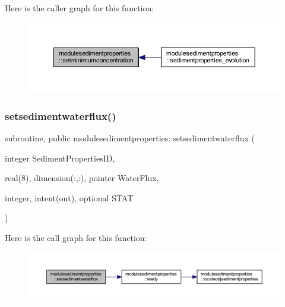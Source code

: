 Here is the caller graph for this function\+:\nopagebreak
\begin{figure}[H]
\begin{center}
\leavevmode
\includegraphics[width=350pt]{namespacemodulesedimentproperties_a9f511535dd36e19d03774f384ee21bc9_icgraph}
\end{center}
\end{figure}
\mbox{\label{namespacemodulesedimentproperties_adc94767ccafe5984e0d36e04b40f9c5a}} 
\subsubsection{\texorpdfstring{setsedimentwaterflux()}{setsedimentwaterflux()}}
{\footnotesize\ttfamily subroutine, public modulesedimentproperties\+::setsedimentwaterflux (\begin{DoxyParamCaption}\item[{integer}]{Sediment\+Properties\+ID,  }\item[{real(8), dimension(\+:,\+:), pointer}]{Water\+Flux,  }\item[{integer, intent(out), optional}]{S\+T\+AT }\end{DoxyParamCaption})}

Here is the call graph for this function\+:\nopagebreak
\begin{figure}[H]
\begin{center}
\leavevmode
\includegraphics[width=350pt]{namespacemodulesedimentproperties_adc94767ccafe5984e0d36e04b40f9c5a_cgraph}
\end{center}
\end{figure}
\mbox{\label{namespacemodulesedimentproperties_acc4f3e2fa34ac7c083b5c86382b68a59}} 
